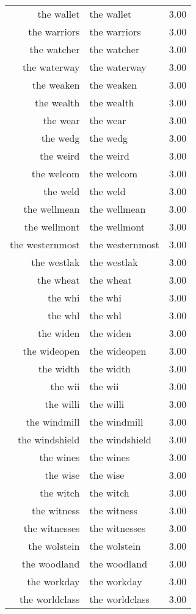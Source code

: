 \begin{table}[ht]
\begin{tabular}{rlr}
  the wallet & the wallet & 3.00 \\ 
  the warriors & the warriors & 3.00 \\ 
  the watcher & the watcher & 3.00 \\ 
  the waterway & the waterway & 3.00 \\ 
  the weaken & the weaken & 3.00 \\ 
  the wealth & the wealth & 3.00 \\ 
  the wear & the wear & 3.00 \\ 
  the wedg & the wedg & 3.00 \\ 
  the weird & the weird & 3.00 \\ 
  the welcom & the welcom & 3.00 \\ 
  the weld & the weld & 3.00 \\ 
  the wellmean & the wellmean & 3.00 \\ 
  the wellmont & the wellmont & 3.00 \\ 
  the westernmost & the westernmost & 3.00 \\ 
  the westlak & the westlak & 3.00 \\ 
  the wheat & the wheat & 3.00 \\ 
  the whi & the whi & 3.00 \\ 
  the whl & the whl & 3.00 \\ 
  the widen & the widen & 3.00 \\ 
  the wideopen & the wideopen & 3.00 \\ 
  the width & the width & 3.00 \\ 
  the wii & the wii & 3.00 \\ 
  the willi & the willi & 3.00 \\ 
  the windmill & the windmill & 3.00 \\ 
  the windshield & the windshield & 3.00 \\ 
  the wines & the wines & 3.00 \\ 
  the wise & the wise & 3.00 \\ 
  the witch & the witch & 3.00 \\ 
  the witness & the witness & 3.00 \\ 
  the witnesses & the witnesses & 3.00 \\ 
  the wolstein & the wolstein & 3.00 \\ 
  the woodland & the woodland & 3.00 \\ 
  the workday & the workday & 3.00 \\ 
  the worldclass & the worldclass & 3.00 \\ 

\end{tabular}
\end{table}
